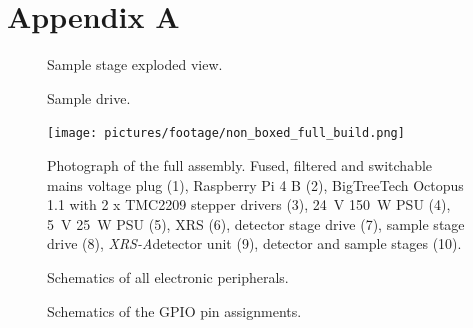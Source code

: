 \chapter{Appendix A}\label{sec:appendix a}
    \begin{figure}[h]
        \centering
        \caption[Sample stage exploded view.]{Sample stage exploded view.}%
        \label{fig:sample stage exploded}%
    \end{figure}
    \newpage
    \begin{figure}[h]
        \centering
        \caption[Sample drive.]{Sample drive.}%
        \label{fig:sample drive}%
    \end{figure}
    \newpage
    \begin{figure}[h]
        \centering
        \texttt{[image: pictures/footage/non\_boxed\_full\_build.png]}
        \caption[Photograph of the full assembly]{Photograph of the full assembly. Fused, filtered and switchable mains voltage plug (1), Raspberry Pi 4 B (2), BigTreeTech Octopus 1.1 with 2 x TMC2209 stepper drivers (3), \qty{24}{\volt} \qty{150}{\watt} PSU (4), \qty{5}{\volt} \qty{25}{\watt} PSU (5), XRS (6), detector stage drive (7), sample stage drive (8), \textit{XRS-A}detector unit (9), detector and sample stages (10).}%
        \label{fig:non boxed full assembly}
    \end{figure}
    \newpage
    \begin{figure}[h]
        \centering
        
        \caption[Schematics of all electronic peripherals]{Schematics of all electronic peripherals.}%
        \label{fig:schematics of peripherals}
    \end{figure}
    \newpage
    \begin{figure}[h]
        \centering
        
        \caption[Schematics of the GPIO pin assignments]{Schematics of the GPIO pin assignments.}%
        \label{fig:schematics of raspberry gpio configuration}
    \end{figure}
